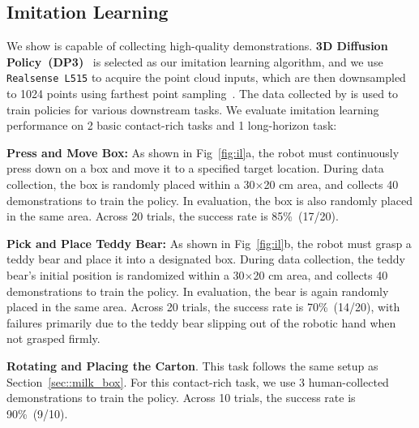 \subsection{Imitation Learning}
\label{sec::IL}

We show \oursystem is capable of collecting high-quality demonstrations. \textbf{3D Diffusion Policy~(DP3)}~\cite{Ze2024DP3} is selected as our imitation learning algorithm, and we use \texttt{Realsense L515} to acquire the point cloud inputs, which are then downsampled to 1024 points using farthest point sampling~\cite{qi2017pointnet}. The data collected by \oursystem is used to train policies for various downstream tasks.
%
We evaluate imitation learning performance on 2 basic contact-rich tasks and 1 long-horizon task: 

\noindent \textbf{Press and Move Box:} As shown in Fig~\ref{fig:il}a, the robot must continuously press down on a box and move it to a specified target location. During data collection, the box is randomly placed within a 30$\times$20 cm area, and \oursystem collects 40 demonstrations to train the policy. In evaluation, the box is also randomly placed in the same area. Across 20 trials, the success rate is 85\%~(17/20). 

\noindent \textbf{Pick and Place Teddy Bear:} As shown in Fig~\ref{fig:il}b, the robot must grasp a teddy bear and place it into a designated box. During data collection, the teddy bear’s initial position is randomized within a 30$\times$20 cm area, and \oursystem collects 40 demonstrations to train the policy. In evaluation, the bear is again randomly placed in the same area. Across 20 trials, the success rate is 70\%~(14/20), with failures primarily due to the teddy bear slipping out of the robotic hand when not grasped firmly.

\noindent \textbf{Rotating and Placing the Carton}. This task follows the same setup as Section~\ref{sec::milk_box}. For this contact-rich task, we use 3 human-collected demonstrations to train the policy. Across 10 trials, the success rate is 90\%~(9/10).
